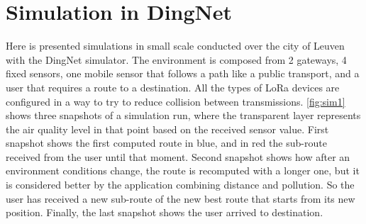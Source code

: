 \section{Simulation in DingNet}
Here is presented simulations in small scale conducted over the city of Leuven with the DingNet simulator. 
The environment is composed from 2 gateways, 4 fixed sensors, one mobile sensor that follows a path like a public transport, and a user that requires a route to a destination.
All the types of LoRa devices are configured in a way to try to reduce collision between transmissions.
\autoref{fig:sim1} shows three snapshots of a simulation run, where the transparent layer represents the air quality level in that point based on the received sensor value.
First snapshot shows the first computed route in blue, and in red the sub-route received from the user until that moment.
Second snapshot shows how after an environment conditions change, the route is recomputed with a longer one, but it is considered better by the application combining distance and pollution. 
So the user has received a new sub-route of the new best route that starts from its new position.
Finally, the last snapshot shows the user arrived to destination.
% 
